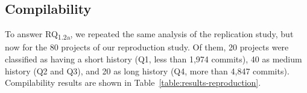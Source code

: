 
\subsection{Compilability}

To answer RQ\textsubscript{1.2a}, we repeated the same analysis of the replication study, but now for the 80 projects of our reproduction study. Of them, 20 projects were classified as having a short history (Q1, less than 1,974 commits), 40 as medium history (Q2 and Q3), and 20 as long history (Q4, more than 4,847 commits). Compilability results are shown in Table~\ref{table:results-reproduction}.

\begin{table*}[h]
\caption{Reproduction study - Compilability results}
\label{table:results-reproduction}


\begin{center}
\end{center}


\end{table*}
